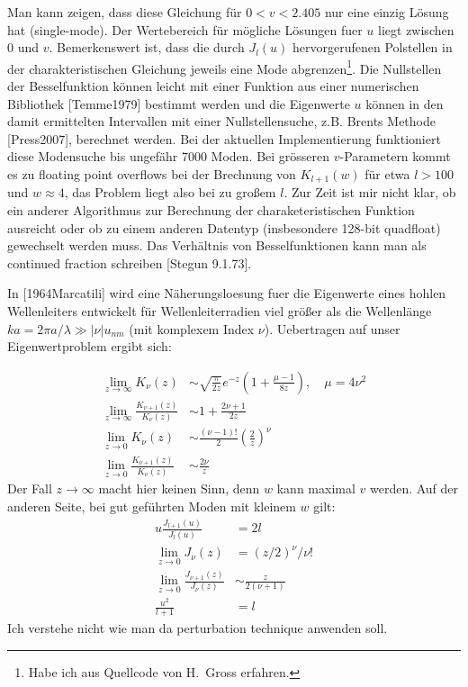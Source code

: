 \documentclass[DIV19,twocolumn]{scrartcl}
\def\({\left(}
\def\){\right)}
\begin{document}
Man kann zeigen, dass diese Gleichung f\"ur $0<v<2.405$ nur eine
einzig L\"osung hat (single-mode). Der Wertebereich f\"ur m\"ogliche
L\"osungen fuer $u$ liegt zwischen 0 und $v$. Bemerkenswert ist, dass
die durch $J_l(u)$ hervorgerufenen Polstellen in der
charakteristischen Gleichung jeweils eine Mode abgrenzen\footnote{Habe
  ich aus Quellcode von H.~Gross erfahren.}. Die Nullstellen der
Besselfunktion k\"onnen leicht mit einer Funktion aus einer
numerischen Bibliothek [Temme1979] bestimmt werden und die Eigenwerte
$u$ k\"onnen in den damit ermittelten Intervallen mit einer
Nullstellensuche, z.B. Brents Methode [Press2007], berechnet werden.
Bei der aktuellen Implementierung funktioniert diese Modensuche bis
ungef\"ahr 7000 Moden. Bei gr\"osseren $v$-Parametern kommt es zu
floating point overflows bei der Brechnung von $K_{l+1}(w)$ f\"ur etwa
$l>100$ und $w\approx 4$, das Problem liegt also bei zu gro\ss em
$l$. Zur Zeit ist mir nicht klar, ob ein anderer Algorithmus zur
Berechnung der charaketeristischen Funktion ausreicht oder ob zu einem
anderen Datentyp (insbesondere 128-bit quadfloat) gewechselt werden
muss. Das Verh\"altnis von Besselfunktionen kann man als continued
fraction schreiben [Stegun 9.1.73]. 

In [1964Marcatili] wird eine N\"aherungsloesung fuer die Eigenwerte
eines hohlen Wellenleiters entwickelt f\"ur Wellenleiterradien viel
gr\"o\ss er als die Wellenl\"ange $ka = 2\pi a/\lambda \gg |\nu|
u_{nm}$ (mit komplexem Index $\nu$). Uebertragen auf unser
Eigenwertproblem ergibt sich:

\begin{align}
  \lim_{z\rightarrow \infty} K_\nu(z) &\sim \sqrt{\frac{\pi}{2z}} e^{-z}\(1+\frac{\mu-1}{8z}\), \quad \mu=4\nu^2 \\ %
  \lim_{z\rightarrow \infty} \frac{K_{\nu+1}(z)}{K_{\nu}(z)} &\sim 1+\frac{2\nu+1}{2z} \\
  \lim_{z\rightarrow 0} K_\nu(z) &\sim \frac{(\nu-1)!}{2} \(\frac{2}{z}\)^\nu \\ %
  \lim_{z\rightarrow 0     } \frac{K_{\nu+1}(z)}{K_{\nu}(z)} &\sim \frac{2\nu}{z}
\end{align}
Der Fall $z\rightarrow \infty$ macht hier keinen Sinn, denn $w$ kann
maximal $v$ werden.
Auf der anderen Seite, bei gut gef\"uhrten Moden mit kleinem $w$ gilt:
\begin{align}
  u\frac{J_{l+1}(u)}{J_l(u)}&=2l \\
  \lim_{z\rightarrow 0} J_\nu(z) &= (z/2)^\nu/\nu!  \\
    \lim_{z\rightarrow 0} \frac{J_{\nu+1}(z)}{J_{\nu}(z)} &\sim \frac{z}{2(\nu+1)} \\
    \frac{u^2}{l+1} &= l
\end{align}
Ich verstehe nicht wie man da perturbation technique anwenden soll.
\end{document}
